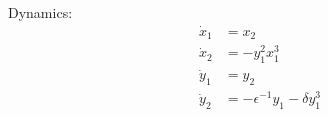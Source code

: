 \documentclass[11pt,reqno]{amsart}
\begin{document}
Dynamics:
\begin{equation}
\begin{split}
\dot{x}_1 &= x_2\\
\dot{x}_2 &= -y_1^2x_1^3\\
\dot{y}_1 &= y_2\\
\dot{y}_2 &= -\epsilon^{-1}y_1 - \delta y_1^3
\end{split}
\end{equation}
\end{document}
